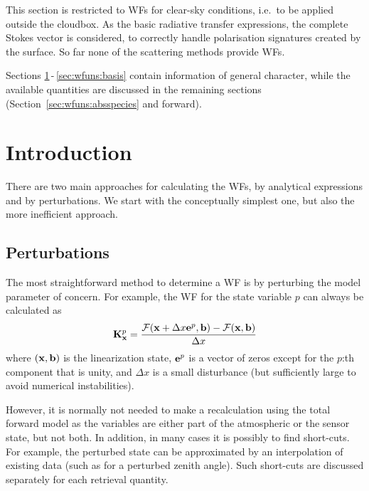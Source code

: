 This section is restricted to WFs for clear-sky conditions, i.e.\ to be applied
outside the cloudbox. As the basic radiative transfer expressions, the complete
Stokes vector is considered, to correctly handle polarisation signatures
created by the surface. So far none of the scattering methods provide WFs.

Sections \ref{sec:wfuns:intro}\,-\,\ref{sec:wfuns:basis} contain information
of general character, while the available quantities are discussed in the
remaining sections (Section~\ref{sec:wfuns:absspecies} and forward).



\section{Introduction}
\label{sec:wfuns:intro}
%
There are two main approaches for calculating the WFs, by analytical
expressions and by perturbations. We start with the conceptually simplest one,
but also the more inefficient approach.



\subsection{Perturbations}
\label{sec:wfuns:pert}
%
The most straightforward method to determine a WF is by perturbing the model
parameter of concern. For example, the WF for the state variable $p$ can always
be calculated as
\begin{equation}
  \mathbf{K}_{\mathbf{x}}^p = \frac{\mathcal{F}(\mathbf{x}+\Delta x\mathbf{e}^p,\mathbf{b})-
                              \mathcal{F}(\mathbf{x},\mathbf{b})}{\Delta x}
 \label{eq:wfuns:perturb}
\end{equation}
where $(\mathbf{x},\mathbf{b})$ is the linearization state, $\mathbf{e}^p$ is a
vector of zeros except for the $p$:th component that is unity, and
$\Delta x$ is a small disturbance (but sufficiently large to avoid
numerical instabilities).

However, it is normally not needed to make a recalculation using the total
forward model as the variables are either part of the atmospheric or the sensor
state, but not both. In addition, in many cases it is possibly to find
short-cuts. For example, the perturbed state can be approximated by an
interpolation of existing data (such as for a perturbed zenith angle). Such
short-cuts are discussed separately for each retrieval quantity.


